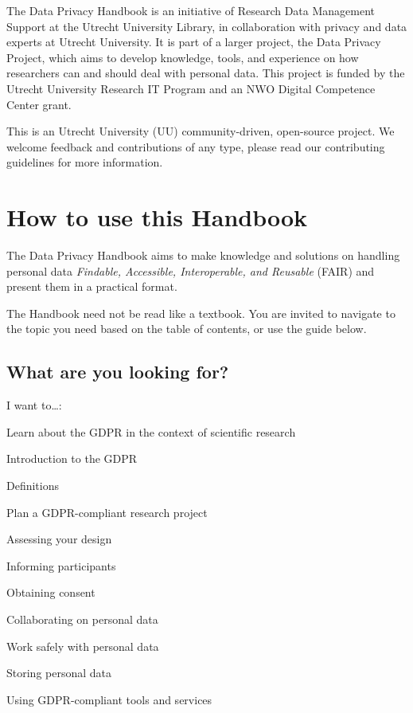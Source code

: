 \documentclass[
]{book}
\begin{document}
The Data Privacy Handbook is an initiative of
Research
Data Management Support at the Utrecht University Library, in collaboration with privacy and data experts at
Utrecht University. It is part of a larger project,
the
Data Privacy Project, which aims to develop knowledge, tools, and experience
on how researchers can and should deal with personal data. This project is
funded by the Utrecht University Research IT Program and an NWO Digital
Competence Center grant.

This is an Utrecht University (UU) community-driven,
open-source project.
We welcome feedback and contributions of any type, please read our contributing guidelines for more information.

\hypertarget{how-to-use-this-handbook}{%
\section{How to use this Handbook}\label{how-to-use-this-handbook}}

The Data Privacy Handbook aims to make knowledge and solutions on handling personal
data \emph{Findable, Accessible, Interoperable, and Reusable} (FAIR) and present them in
a practical format.

The Handbook need not be read like a textbook. You are invited to navigate to the
topic you need based on the table of contents, or use the guide below.

\hypertarget{what-are-you-looking-for}{%
\subsection{What are you looking for?}\label{what-are-you-looking-for}}

I want to\ldots:

Learn about the GDPR in the context of scientific research

Introduction to the GDPR

Definitions

Plan a GDPR-compliant research project

Assessing your design

Informing participants

Obtaining consent

Collaborating on personal data

Work safely with personal data

Storing personal data

Using GDPR-compliant tools and services
\end{document}
